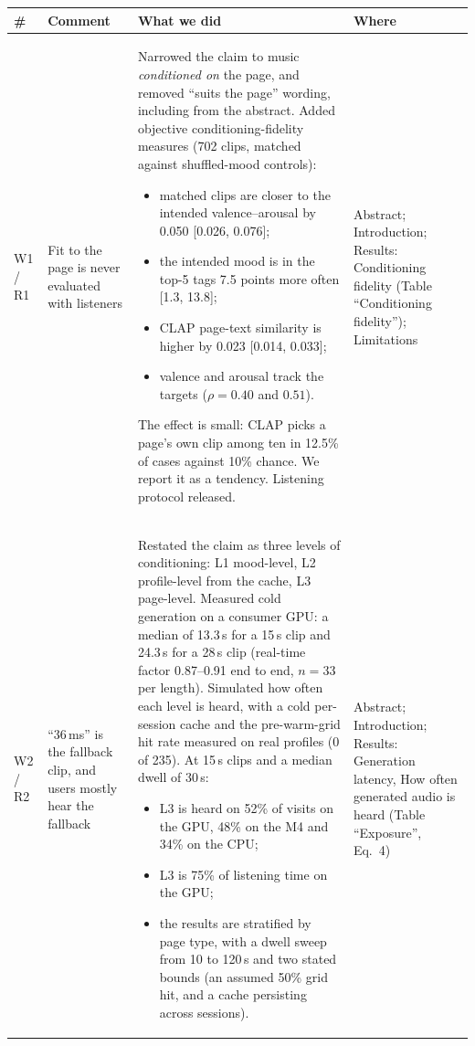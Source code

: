 \documentclass[10pt]{article}
\begin{document}
\begin{xltabular}{\textwidth}{@{}R{1.25cm}R{3.6cm}LR{3.2cm}@{}}
\toprule
\textbf{\#} & \textbf{Comment} & \textbf{What we did} & \textbf{Where} \\
\midrule
\endhead
W1 / R1 & Fit to the page is never evaluated with listeners &
Narrowed the claim to music \emph{conditioned on} the page, and removed ``suits the page''
wording, including from the abstract. Added objective conditioning-fidelity measures
(702 clips, matched against shuffled-mood controls):
\begin{itemize}
\item matched clips are closer to the intended valence--arousal by 0.050 [0.026, 0.076];
\item the intended mood is in the top-5 tags 7.5 points more often [1.3, 13.8];
\item CLAP page-text similarity is higher by 0.023 [0.014, 0.033];
\item valence and arousal track the targets ($\rho = 0.40$ and $0.51$).
\end{itemize}
The effect is small: CLAP picks a page's own clip among ten in 12.5\% of cases against 10\%
chance. We report it as a tendency. Listening protocol released. &
Abstract; Introduction; Results: Conditioning fidelity (Table ``Conditioning fidelity''); Limitations \\
\midrule
W2 / R2 & ``36\,ms'' is the fallback clip, and users mostly hear the fallback &
Restated the claim as three levels of conditioning: L1 mood-level, L2 profile-level from the
cache, L3 page-level. Measured cold generation on a consumer GPU: a median of 13.3\,s for a
15\,s clip and 24.3\,s for a 28\,s clip (real-time factor 0.87--0.91 end to end, $n=33$ per
length).
Simulated how often each level is heard, with a cold per-session cache and the pre-warm-grid
hit rate measured on real profiles (0 of 235). At 15\,s clips and a median dwell of 30\,s:
\begin{itemize}
\item L3 is heard on 52\% of visits on the GPU, 48\% on the M4 and 34\% on the CPU;
\item L3 is 75\% of listening time on the GPU;
\item the results are stratified by page type, with a dwell sweep from 10 to 120\,s and two
  stated bounds (an assumed 50\% grid hit, and a cache persisting across sessions).
\end{itemize} &
Abstract; Introduction; Results: Generation latency, How often generated audio is heard (Table ``Exposure'', Eq.~4) \\

\end{xltabular}
\end{document}
